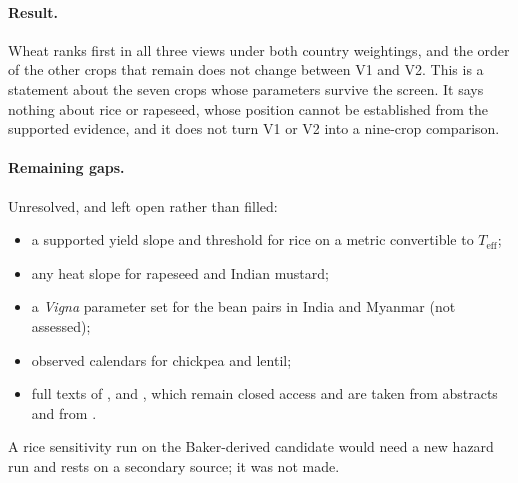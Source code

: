 \paragraph{Result.} Wheat ranks first in all three views under both country weightings, and the order of the other
crops that remain does not change between V1 and V2. This is a statement about the seven crops whose parameters
survive the screen. It says nothing about rice or rapeseed, whose position cannot be established from the
supported evidence, and it does not turn V1 or V2 into a nine-crop comparison.

\paragraph{Remaining gaps.} Unresolved, and left open rather than filled:
\begin{itemize}
\item a supported yield slope and threshold for rice on a metric convertible to $T_{\text{eff}}$;
\item any heat slope for rapeseed and Indian mustard;
\item a \emph{Vigna} parameter set for the bean pairs in India and Myanmar (not assessed);
\item observed calendars for chickpea and lentil;
\item full texts of \citet{prasad2002bean}, \citet{prasad2003peanut} and \citet{morrison2002}, which remain closed
access and are taken from abstracts and from \citet{boote2005}.
\end{itemize}
A rice sensitivity run on the Baker-derived candidate would need a new hazard run and rests on a secondary source;
it was not made.
